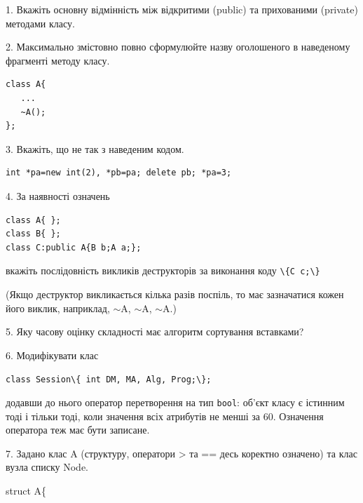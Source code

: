 \documentclass[12pt, ukrainian]{article}
\def\code#1{\Verb!#1!}
\begin{document}
{%
1. Вкажіть основну відмінність між відкритими (public) та прихованими (private) методами класу.%
\par
\vspace{2mm}
2. Максимально змістовно повно сформулюйте назву оголошеного в наведеному фрагменті методу класу.
\vspace{-3mm}
\begin{verbatim}class A{
   ...
   ~A();
};\end{verbatim}
\vspace{-3mm}
\par
\vspace{2mm}
3. Вкажіть, що не так з наведеним кодом.
\vspace{-3mm}
\begin{verbatim}int *pa=new int(2), *pb=pa; delete pb; *pa=3;\end{verbatim}
\vspace{-3mm}
\par
\vspace{2mm}
4. За наявності означень
\vspace{-3mm}
\begin{verbatim}
class A{ };
class B{ };
class C:public A{B b;A a;};\end{verbatim}
\vspace{-3mm}
вкажіть послідовність викликів деструкторів за виконання коду \code{\{C c;\}} 

(Якщо деструктор викликається кілька разів поспіль, то має зазначатися кожен його виклик, наприклад, $\sim$A, $\sim$A, $\sim$A.)

\vspace{2mm}
5. Яку часову оцінку складності має алгоритм сортування вставками?
\par
\vspace{2mm}
6. Модифікувати клас 

\qquad\code{class Session\{ int DM, MA, Alg, Prog;\};} 


додавши до нього оператор перетворення на тип \code{bool}: об'єкт класу є істинним тоді і тільки тоді, коли значення всіх атрибутів не менші за 60. Означення оператора теж має бути записане.%
\par
\vspace{2mm}
7. 
Задано клас A (структуру, оператори > та == десь коректно означено) та клас вузла списку Node.

struct A\{

}
\end{document}

